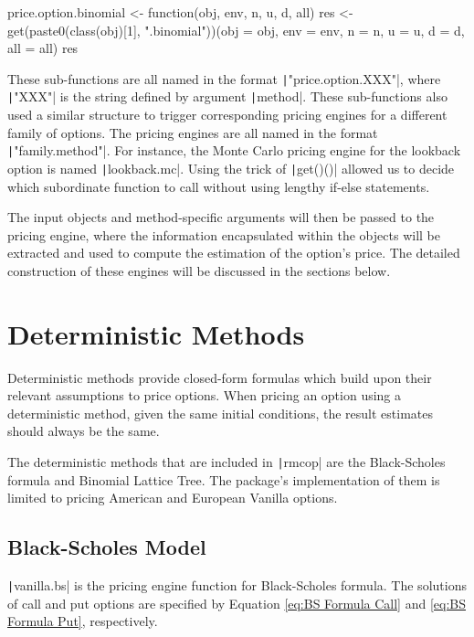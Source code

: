 \begin{Rminted}
price.option.binomial <- function(obj, env, n, u, d, all) {
    res <- get(paste0(class(obj)[1], ".binomial"))(obj = obj, env = env, n = n, u = u, d = d, all = all)
    res
}
\end{Rminted}

These sub-functions are all named in the format \texttt|"price.option.XXX"|, where \texttt|"XXX"| is the string defined by argument \texttt|method|. These sub-functions also used a similar structure to trigger corresponding pricing engines for a different family of options. The pricing engines are all named in the format \texttt|"family.method"|. For instance, the Monte Carlo pricing engine for the lookback option is named \texttt|lookback.mc|. Using the trick of \texttt|get()()| allowed us to decide which subordinate function to call without using lengthy if-else statements.

The input objects and method-specific arguments will then be passed to the pricing engine, where the information encapsulated within the objects will be extracted and used to compute the estimation of the option's price. The detailed construction of these engines will be discussed in the sections below.

\section{Deterministic Methods} \label{sec:det_dev}

Deterministic methods provide closed-form formulas which build upon their relevant assumptions to price options. When pricing an option using a deterministic method, given the same initial conditions, the result estimates should always be the same.

The deterministic methods that are included in \texttt|rmcop| are the Black-Scholes formula and Binomial Lattice Tree. The package's implementation of them is limited to pricing American and European Vanilla options.

\subsection{Black-Scholes Model}

\texttt|vanilla.bs| is the pricing engine function for Black-Scholes formula. The solutions of call and put options are specified by Equation \ref{eq:BS Formula Call} and \ref{eq:BS Formula Put}, respectively.

